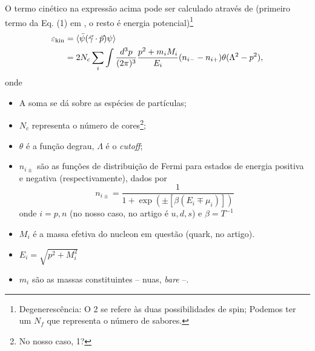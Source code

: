 O termo cinético na expressão acima pode ser calculado através de (primeiro termo da Eq. (1) em \cite{PRC_68_035804_2003}, o resto é energia potencial)\footnote{Degenerescência: O 2 se refere às duas possibilidades de spin; Podemos ter um $N_f$ que representa o número de sabores.}
\begin{align}
	\varepsilon_{\rm{kin}} &= \langle\bar{\psi}(\vec{\gamma}\cdot\vec{p})\psi\rangle \\
	&= 2 N_c\sum_i \int \frac{d^3p}{(2\pi)^3}\frac{p^2 + m_i M_i}{E_i}(n_{i-}-n_{i+})\theta(\Lambda^2 - p^2),
\end{align}
%
onde
\begin{itemize}
	\item A soma se dá sobre as espécies de partículas;
	\item $N_c$ representa o número de cores\footnote{No nosso caso, 1?};
	\item $\theta$ é a função degrau, $\Lambda$ é o \emph{cutoff};
	\item $n_{i\pm}$ são as funções de distribuição de Fermi para estados de energia positiva e negativa (respectivamente), dados por
	\begin{equation}
		n_{i\pm} = \frac{1}{1 + \exp(\pm[\beta(E_i\mp\mu_i)])}
	\end{equation}
	onde $i = p, n$ (no nosso caso, no artigo é $u, d, s$) e $\beta = T^{-1}$
	\item $M_i$ é a massa efetiva do nucleon em questão (quark, no artigo).
	\item $E_i = \sqrt{p^2 + M_i^2}$
	\item $m_i$ são as massas constituintes -- nuas, \emph{bare} --.
\end{itemize}

